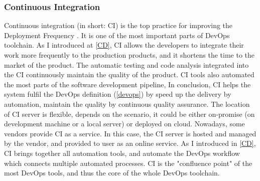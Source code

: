 \subsubsection{Continuous Integration}
Continuous integration (in short: CI) is the top practice for improving the Deployment Frequency \cite{velasquez2014state}. It is one of the most important parts of DevOps toolchain. As I introduced at \ref{CD}, CI allows the developers to integrate their work more frequently to the production products, and it shortens the time to the market of the product. The automatic testing and code analysis integrated into the CI continuously maintain the quality of the product. CI tools also automated the most parts of the software development pipeline, In conclusion, CI helps the system fulfil the DevOps definition (\ref{devops}) by speed up the delivery by automation, maintain the quality by continuous quality assurance. 
The location of CI server is flexible, depends on the scenario, it could be either on-promise (on development machine or a local server) or deployed on cloud. Nowadays, some vendors provide CI as a service. In this case, the CI server is hosted and managed by the vendor, and provided to user as an online service. As I introduced in \ref{CD}, CI brings together all automation tools, and automate the DevOps workflow which connects multiple automated processes. CI is the "confluence point" of the most DevOps tools, and thus the core of the whole DevOps toolchain.
